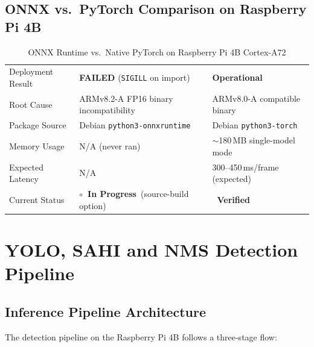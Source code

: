 \documentclass[12pt,a4paper]{article}
\newcommand{\verified}{{\color{statusgreen}\textbf{\checkmark~Verified}}}
\newcommand{\inprogress}{{\color{statusamber}\textbf{$\circ$~In Progress}}}
\begin{document}
\subsection{ONNX vs.\ PyTorch Comparison on Raspberry Pi 4B}

\renewcommand{\arraystretch}{1.30}
\begin{table}[H]
\centering
\caption{ONNX Runtime vs.\ Native PyTorch on Raspberry Pi 4B Cortex-A72}
\label{tab:onnx_vs_pt}
\small
\begin{tabularx}{\linewidth}{@{} L{4.0cm} X X @{}}
\toprule
{} &  &  \\
\midrule
{}
Deployment Result  & \textbf{FAILED} (\texttt{SIGILL} on import) & \textbf{Operational} \\
Root Cause         & ARMv8.2-A FP16 binary incompatibility & ARMv8.0-A compatible binary \\
Package Source     & Debian \texttt{python3-onnxruntime}     & Debian \texttt{python3-torch} \\
Memory Usage       & N/A (never ran)                         & $\sim$180\,MB single-model mode \\
Expected Latency   & N/A                                     & 300--450\,ms/frame (expected) \\
Current Status     & \inprogress{}\ (source-build option)     & \verified \\
\bottomrule
\end{tabularx}
\end{table}

\clearpage

\section{YOLO, SAHI and NMS Detection Pipeline}

\subsection{Inference Pipeline Architecture}

The detection pipeline on the Raspberry Pi 4B follows a three-stage flow:
\end{document}
